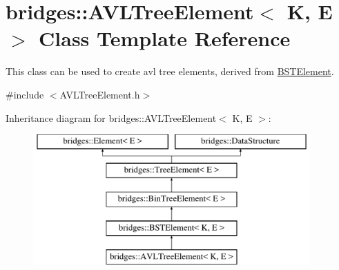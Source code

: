 \hypertarget{classbridges_1_1_a_v_l_tree_element}{}\section{bridges\+:\+:A\+V\+L\+Tree\+Element$<$ K, E $>$ Class Template Reference}
\label{classbridges_1_1_a_v_l_tree_element}


This class can be used to create avl tree elements, derived from \hyperlink{classbridges_1_1_b_s_t_element}{B\+S\+T\+Element}.  




{\ttfamily \#include $<$A\+V\+L\+Tree\+Element.\+h$>$}

Inheritance diagram for bridges\+:\+:A\+V\+L\+Tree\+Element$<$ K, E $>$\+:\begin{figure}[H]
\begin{center}
\leavevmode
\includegraphics[height=5.000000cm]{classbridges_1_1_a_v_l_tree_element}
\end{center}
\end{figure}
